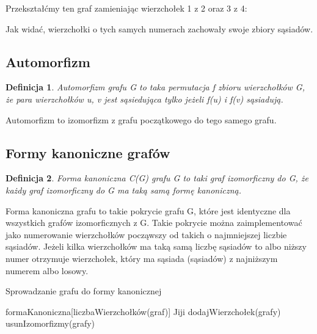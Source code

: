 \documentclass[11pt]{article}
\newtheorem{definition}{Definicja}[section]
\begin{document}
  Przekształćmy ten graf zamieniając wierzchołek 1 z 2 oraz 3 z 4:
  \begin{figure}[h]
    \centering
    \caption{}
  \end{figure}

  Jak widać, wierzchołki o tych samych numerach zachowały swoje zbiory sąsiadów. 

  \subsection{Automorfizm}

  \begin{definition}
    Automorfizm grafu G to taka permutacja f zbioru wierzchołków G, że para wierzchołków u, v jest sąsiedująca tylko jeżeli f(u) i f(v) sąsiadują. 
  \end{definition}
  Automorfizm to izomorfizm z grafu początkowego do tego samego grafu. 

  \subsection{Formy kanoniczne grafów}

  \begin{definition}
    Forma kanoniczna C(G) grafu G to taki graf izomorficzny do G, że każdy graf izomorficzny do G ma taką samą formę kanoniczną. 
  \end{definition}
  Forma kanoniczna grafu to takie pokrycie grafu G, 
  które jest identyczne dla wszystkich grafów izomorficznych z G. Takie pokrycie można zaimplementować
   jako numerowanie wierzchołków począwszy od takich o najmniejszej liczbie sąsiadów. 
   Jeżeli kilka wierzchołków ma taką samą liczbę sąsiadów to albo niższy numer otrzymuje wierzchołek, 
   który ma sąsiada (sąsiadów) z najniższym numerem albo losowy. 

   \begin{algorithm}
    \caption{Sprowadzanie grafu do formy kanonicznej}
    \begin{algorithmic}
    \STATE formaKanoniczna[liczbaWierzchołków(graf)]
        \STATE Jiji
      \ENDWHILE
    \ENDFOR
      \STATE dodajWierzchołek(grafy)
      \STATE usunIzomorfizmy(grafy)
    \ENDWHILE
    \end{algorithmic}
    \end{algorithm}
\end{document}
